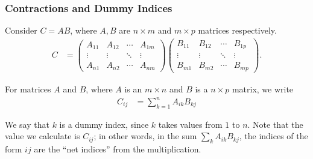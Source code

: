 \documentclass[10pt]{mypackage}
\begin{document}
\subsubsection{Contractions and Dummy Indices}%
Consider $C = AB$, where $A,B $ are $n\times m$ and $m\times p$ matrices respectively.
\begin{align*}
  C &= \begin{pmatrix}A_{11} & A_{12} & \cdots & A_{1m}\\
  \vdots & \vdots & \ddots & \vdots\\
A_{n1} & A_{n2} & \cdots & A_{nm}\end{pmatrix} \begin{pmatrix}B_{11} & B_{12} & \cdots & B_{1p}\\
  \vdots & \vdots & \ddots & \vdots\\
B_{m1} & B_{m2} & \cdots & B_{mp}\end{pmatrix}.
\end{align*}
%
\begin{definition}
  For matrices $A$ and $B$, where $A$ is an $m\times n$ and $B$ is a $n\times p$ matrix, we write
  \begin{align*}
    C_{ij} &= \sum_{k=1}^{n}A_{ik}B_{kj}
  \end{align*}
\end{definition}
We say that $k$ is a dummy index, since $k$ takes values from $1$ to $n$. Note that the value we calculate is $C_{ij}$; in other words, in the sum $\sum_{k}A_{ik}B_{kj}$, the indices of the form $ij$ are the ``net indices'' from the multiplication.\newline
\end{document}

